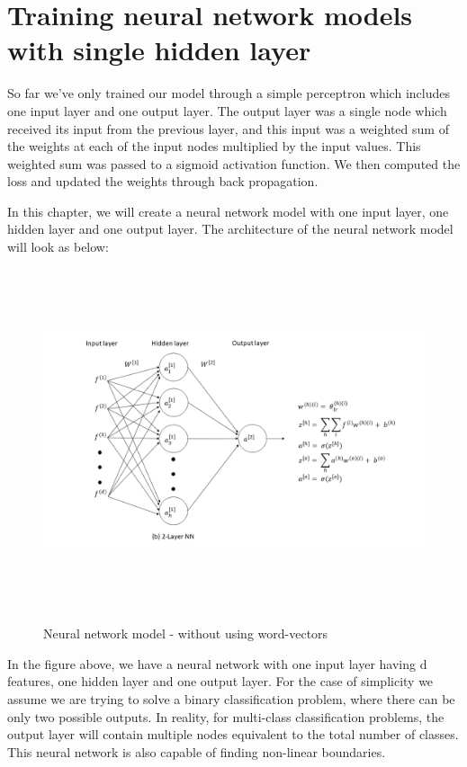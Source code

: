 \newpage
\section{Training neural network models with single hidden layer}

So far we've only trained our model through a simple perceptron which includes one input layer and one output layer. The output layer was a single node which received its input from the previous layer, and this input was a weighted sum of the weights at each of the input nodes multiplied by the input values. This weighted sum was passed to a sigmoid activation function. We then computed the loss and updated the weights through back propagation.

In this chapter, we will create a neural network model with one input layer, one hidden layer and one output layer. The architecture of the neural network model will look as below:

\begin{figure}[htbp]
\centering
\includegraphics[width=16cm, height=10cm]{images/nn1.png}\\
\centering
\caption{Neural network model - without using word-vectors}
\label{fig:foo}
\end{figure}

In the figure above, we have a neural network with one input layer having d features, one hidden layer and one output layer. For the case of simplicity we assume we are trying to solve a binary classification problem, where there can be only two possible outputs. In reality, for multi-class classification problems, the output layer will contain multiple nodes equivalent to the total number of classes. This neural network is also capable of finding non-linear boundaries.


